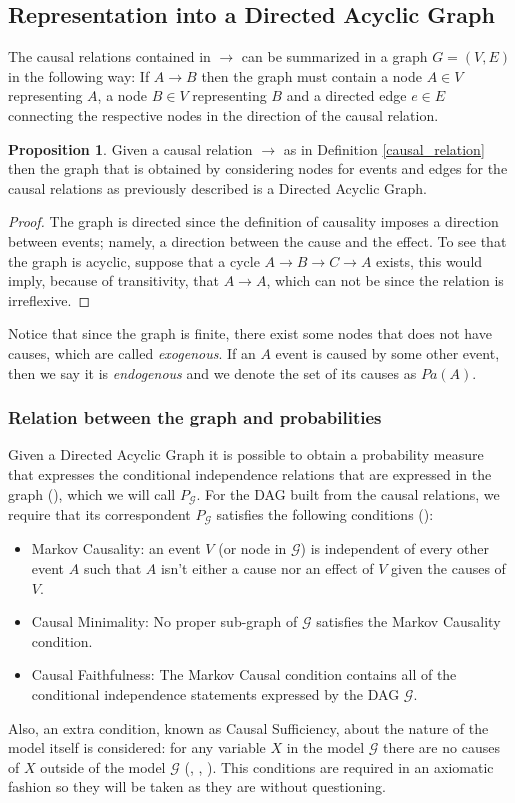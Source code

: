 \documentclass[english,letterpaper,12pt,final]{article}
\theoremstyle{definition}
\newtheorem{prop}{Proposition}[section]
\begin{document}
	\subsection{Representation into a Directed Acyclic Graph}
	The causal relations contained in $\to$ can be summarized in a graph $G=(V,E)$ in the following way: If $A \to B$ then the graph must contain a node $A \in V$ representing $A$, a node  $B \in V$ representing $B$ and a directed edge $e \in E$ connecting the respective nodes in the direction of the causal relation.
	\begin{prop}
	Given a causal relation $\to$ as in Definition \ref{causal_relation} then the graph that is obtained by considering nodes for events and edges for the causal relations as previously described is a Directed Acyclic Graph.
	\end{prop}
	\begin{proof}
	The graph is directed since the definition of causality imposes a direction between events; namely, a direction between the cause and the effect. To see that the graph is acyclic, suppose that a cycle $A \to B \to C \to A$ exists, this would imply, because of transitivity, that $A \to A$, which can not be since the relation is irreflexive.
	\end{proof}
	Notice that since the graph is finite, there exist some nodes that does not have causes, which are called \textit{exogenous}. If an $A$ event is caused by some other event, then we say it is \textit{endogenous} and we denote the set of its causes as $Pa(A)$.
	\subsubsection{Relation between the graph and probabilities}
	Given a Directed Acyclic Graph it is possible to obtain a probability measure that expresses the conditional independence relations that are expressed in the graph (\cite{koller2009probabilistic}), which we will call $P_\mathcal{G}$. For the DAG built from the causal relations, we require that its correspondent $P_\mathcal{G}$ satisfies the following conditions (\cite{spirtes2000causation}):
	\begin{itemize}
	\item Markov Causality: an event $V$ (or node in $\mathcal{G}$) is independent of every other event $A$ such that $A$ isn't either a cause nor an effect of $V$ given the causes of $V$.
	\item Causal Minimality: No proper sub-graph of $\mathcal{G}$ satisfies the Markov Causality condition.
	\item Causal Faithfulness: The Markov Causal condition contains all of the conditional independence statements expressed by the DAG $\mathcal{G}$.
	\end{itemize}
	Also, an extra condition, known as Causal Sufficiency, about the nature of the model itself is considered: for any variable $X$ in the model $\mathcal{G}$ there are no causes of $X$ outside of the model $\mathcal{G}$ (\cite{spirtes2000causation}, \cite{pearl2009causality}, \cite{sucar2015probabilistic}).
	This conditions are required in an axiomatic fashion so they will be taken as they are without questioning.
\end{document}

